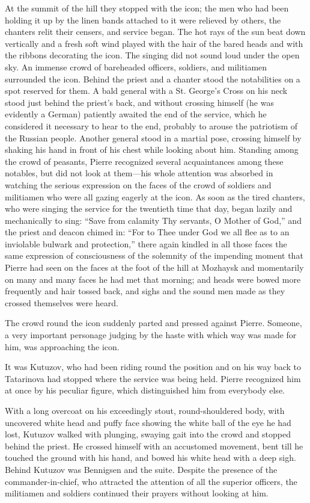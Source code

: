 At the summit of the hill they stopped with the icon; the men who
had been holding it up by the linen bands attached to it were
relieved by others, the chanters relit their censers, and service
began. The hot rays of the sun beat down vertically and a fresh
soft wind played with the hair of the bared heads and with the
ribbons decorating the icon.  The singing did not sound loud
under the open sky. An immense crowd of bareheaded officers,
soldiers, and militiamen surrounded the icon.  Behind the priest
and a chanter stood the notabilities on a spot reserved for
them. A bald general with a St. George's Cross on his neck stood
just behind the priest's back, and without crossing himself (he
was evidently a German) patiently awaited the end of the service,
which he considered it necessary to hear to the end, probably to
arouse the patriotism of the Russian people. Another general
stood in a martial pose, crossing himself by shaking his hand in
front of his chest while looking about him. Standing among the
crowd of peasants, Pierre recognized several acquaintances among
these notables, but did not look at them---his whole attention
was absorbed in watching the serious expression on the faces of
the crowd of soldiers and militiamen who were all gazing eagerly
at the icon. As soon as the tired chanters, who were singing the
service for the twentieth time that day, began lazily and
mechanically to sing: ``Save from calamity Thy servants, O Mother
of God,'' and the priest and deacon chimed in: ``For to Thee
under God we all flee as to an inviolable bulwark and
protection,'' there again kindled in all those faces the same
expression of consciousness of the solemnity of the impending
moment that Pierre had seen on the faces at the foot of the hill
at Mozhaysk and momentarily on many and many faces he had met
that morning; and heads were bowed more frequently and hair
tossed back, and sighs and the sound men made as they crossed
themselves were heard.

The crowd round the icon suddenly parted and pressed against
Pierre.  Someone, a very important personage judging by the haste
with which way was made for him, was approaching the icon.

It was Kutuzov, who had been riding round the position and on his
way back to Tatarinova had stopped where the service was being
held. Pierre recognized him at once by his peculiar figure, which
distinguished him from everybody else.

With a long overcoat on his exceedingly stout, round-shouldered
body, with uncovered white head and puffy face showing the white
ball of the eye he had lost, Kutuzov walked with plunging,
swaying gait into the crowd and stopped behind the priest. He
crossed himself with an accustomed movement, bent till he touched
the ground with his hand, and bowed his white head with a deep
sigh. Behind Kutuzov was Bennigsen and the suite. Despite the
presence of the commander-in-chief, who attracted the attention
of all the superior officers, the militiamen and soldiers
continued their prayers without looking at him.

